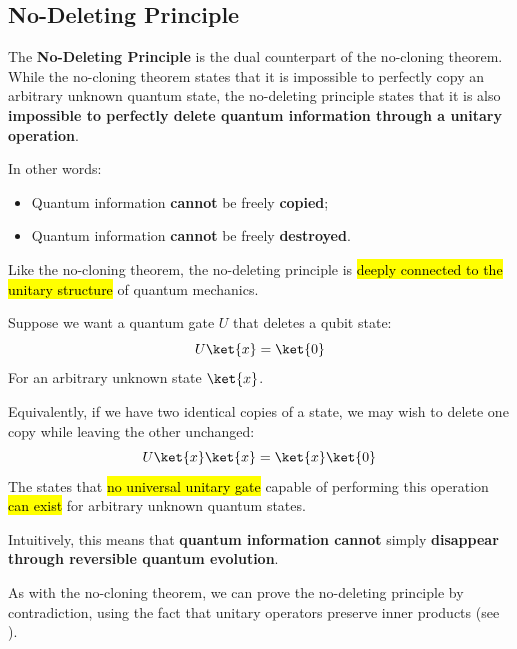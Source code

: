 \subsection{No-Deleting Principle}\label{sec:no-deleting-principle}

The \textbf{No-Deleting Principle} is the dual counterpart of the no-cloning theorem. While the no-cloning theorem states that it is impossible to perfectly copy an arbitrary unknown quantum state, the no-deleting principle states that it is also \textbf{impossible to perfectly delete quantum information through a unitary operation}.

\highspace
In other words:
\begin{itemize}
    \item Quantum information \textbf{cannot} be freely \textbf{copied};
    \item Quantum information \textbf{cannot} be freely \textbf{destroyed}.
\end{itemize}
Like the no-cloning theorem, the no-deleting principle is \hl{deeply connected to the unitary structure} of quantum mechanics.

\highspace
\begin{definitionbox}
    Suppose we want a quantum gate $U$ that deletes a qubit state:
    \begin{equation*}
        U\ket{x}=\ket{0}
    \end{equation*}
    For an arbitrary unknown state $\ket{x}$.

    \highspace
    Equivalently, if we have two identical copies of a state, we may wish to delete one copy while leaving the other unchanged:
    \begin{equation}
        U\ket{x}\ket{x} = \ket{x}\ket{0}
    \end{equation}
    The  states that \hl{no universal unitary gate} capable of performing this operation \hl{can exist} for arbitrary unknown quantum states.

    \highspace
    Intuitively, this means that \textbf{quantum information cannot} simply \textbf{disappear through reversible quantum evolution}.
\end{definitionbox}

\highspace
As with the no-cloning theorem, we can prove the no-deleting principle by contradiction, using the fact that unitary operators preserve inner products (see ).

